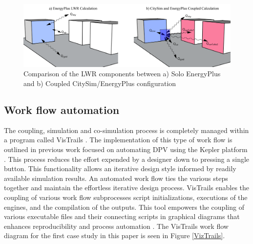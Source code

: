 \documentclass{tBPS2e}
\theoremstyle{plain}
\theoremstyle{definition}
\theoremstyle{remark}
\newcommand{\noteCM}[1]{\footnote{\textcolor{red}{#1}}}
\newcommand{\noteDT}[1]{\footnote{\textcolor{green}{#1}}}
\begin{document}
\begin{figure}[H]
  \centering
  \includegraphics[width=1.0\textwidth]{figures/LWRCalc_Combined_V3}
  \caption{Comparison of the LWR components between a) Solo EnergyPlus and b) Coupled CitySim/EnergyPlus configuration \citep{Miller:2015vk}
  \label{combinedLWR}}
\end{figure}

\subsection{Work flow automation}
The coupling, simulation and co-simulation process is completely managed
within a program called VisTrails \citep{Anonymous:Cayf2tu7}. The
implementation of this type of work flow is outlined in previous work focused
on automating DPV using the Kepler platform \citep{Thomas:2012wj}. This
process reduces the effort expended by a designer down to pressing a single
button. This functionality allows an iterative design style informed by
readily available simulation results. An automated work flow ties the
various steps together and maintain the effortless iterative design process.
VisTrails enables the coupling of various work flow subprocesses script
initializations, executions of the engines, and the compilation of the
outputs. This tool empowers the coupling of various executable files and their
connecting scripts in graphical diagrams that enhances reproducibility and
process automation \citep{Freire:2014tt}. The VisTrails work flow diagram for
the first case study in this paper is seen in Figure \ref{VizTrails}.

\end{document}
